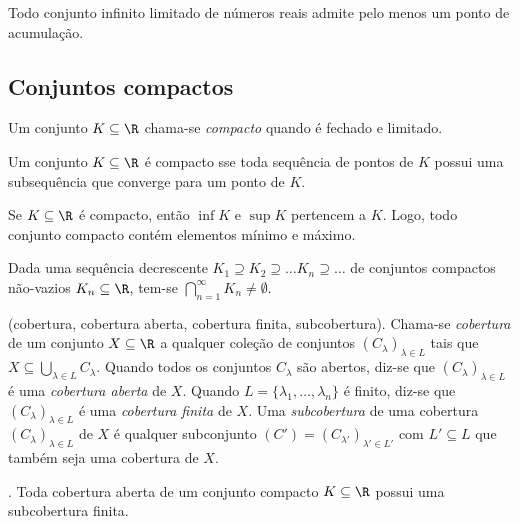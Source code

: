 \documentclass{article}
\begin{document}
\begin{prop}
    Todo conjunto infinito limitado de números reais admite pelo menos um ponto de acumulação.
\end{prop}

\subsection{Conjuntos compactos}

\begin{defn}
    Um conjunto \(K \subseteq \R\) chama-se \emph{compacto} quando é fechado e limitado.
\end{defn}

\begin{prop}
    Um conjunto \(K \subseteq \R\) é compacto sse toda sequência de pontos de \(K\) possui uma subsequência que converge para um ponto de \(K\).
\end{prop}

\begin{rem}
    Se \(K \subseteq \R\) é compacto, então \(\inf K\) e \(\sup K\) pertencem a \(K\). Logo, todo conjunto compacto contém elementos mínimo e máximo.
\end{rem}

\begin{prop}
    Dada uma sequência decrescente \(K_1 \supseteq K_2 \supseteq \ldots K_n \supseteq \ldots\) de conjuntos compactos não-vazios \(K_n \subseteq \R\), tem-se \(\bigcap_{n=1}^{\infty} K_n \neq \emptyset\).
\end{prop}

\begin{defn} (cobertura, cobertura aberta, cobertura finita, subcobertura).
    Chama-se \emph{cobertura} de um conjunto \(X \subseteq \R\) a qualquer coleção de conjuntos \((C_\lambda)_{\lambda \in L}\) tais que \(X \subseteq \bigcup_{\lambda \in L} C_\lambda\).
    Quando todos os conjuntos \(C_\lambda\) são abertos, diz-se que \((C_\lambda)_{\lambda \in L}\) é uma \emph{cobertura aberta} de \(X\). Quando \(L = \{\lambda_1, \ldots, \lambda_n\}\) é finito, diz-se que \((C_\lambda)_{\lambda \in L}\) é uma \emph{cobertura finita} de \(X\). Uma \emph{subcobertura} de uma cobertura \((C_\lambda)_{\lambda \in L}\) de \(X\) é qualquer subconjunto \((C') = (C_{\lambda'})_{\lambda' \in L'}\) com \(L' \subseteq L\) que também seja uma cobertura de \(X\).
\end{defn}

\begin{thm} .
    Toda cobertura aberta de um conjunto compacto \(K \subseteq \R\) possui uma subcobertura finita.
\end{thm}
\end{document}
